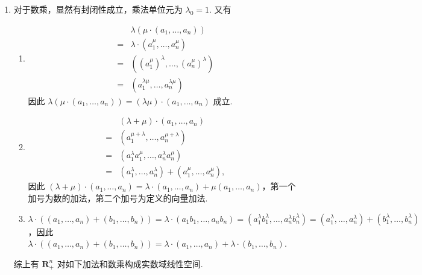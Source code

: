 \begin{exercise}
\begin{exgroup}
\begin{answer}
\begin{enumerate}
\begin{enumerate}
                          \item 对于数乘，显然有封闭性成立，乘法单位元为 $\lambda_0=1$. 又有
                                \begin{enumerate}
                                    \item \begin{align*}
                                                  & \lambda(\mu\cdot(a_1,\ldots,a_n))            \\
                                              ={} & \lambda\cdot(a_1^\mu,\ldots,a_n^\mu)         \\
                                              ={} & ((a_1^\mu)^\lambda,\ldots,(a_n^\mu)^\lambda) \\
                                              ={} & (a_1^{\lambda\mu},\ldots,a_n^{\lambda\mu})
                                          \end{align*}
                                          因此 $\lambda(\mu\cdot(a_1,\ldots,a_n))=(\lambda\mu)\cdot(a_1,\ldots,a_n)$ 成立.

                                    \item \begin{align*}
                                                  & (\lambda+\mu)\cdot(a_1,\ldots,a_n)                         \\
                                              ={} & (a_1^{\mu+\lambda},\ldots,a_n^{\mu+\lambda})               \\
                                              ={} & (a_1^\lambda a_1^\mu,\ldots,a_n^\lambda a_n^\mu)           \\
                                              ={} & (a_1^\lambda,\ldots,a_n^\lambda)+(a_1^\mu,\ldots,a_n^\mu),
                                          \end{align*}
                                          因此 $(\lambda+\mu)\cdot(a_1,\ldots,a_n)=\lambda\cdot(a_1,\ldots,a_n)+\mu(a_1,\ldots,a_n)$，第一个加号为数的加法，第二个加号为定义的向量加法.

                                    \item $\lambda\cdot((a_1,\ldots,a_n)+(b_1,\ldots,b_n))=\lambda\cdot(a_1b_1,\ldots,a_nb_n)=(a_1^\lambda b_1^\lambda,\ldots,a_n^\lambda b_n^\lambda)=(a_1^\lambda,\ldots,a_n^\lambda)+(b_1^\lambda,\ldots,b_n^\lambda)$，因此 $\lambda\cdot((a_1,\ldots,a_n)+(b_1,\ldots,b_n))=\lambda\cdot(a_1,\ldots,a_n)+\lambda\cdot(b_1,\ldots,b_n)$.
                                \end{enumerate}
                                综上有 $\mathbf{R}_+^n$ 对如下加法和数乘构成实数域线性空间.
                      \end{enumerate}



\end{enumerate}
\end{answer}
\end{exgroup}
\end{exercise}
